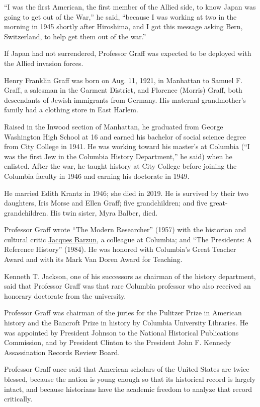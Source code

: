 ``I was the first American, the first member of the Allied side, to know
Japan was going to get out of the War,'' he said, ``because I was
working at two in the morning in 1945 shortly after Hiroshima, and I got
this message asking Bern, Switzerland, to help get them out of the
war.''

If Japan had not surrendered, Professor Graff was expected to be
deployed with the Allied invasion forces.

Henry Franklin Graff was born on Aug. 11, 1921, in Manhattan to Samuel
F. Graff, a salesman in the Garment District, and Florence (Morris)
Graff, both descendants of Jewish immigrants from Germany. His maternal
grandmother's family had a clothing store in East Harlem.

Raised in the Inwood section of Manhattan, he graduated from George
Washington High School at 16 and earned his bachelor of social science
degree from City College in 1941. He was working toward his master's at
Columbia (``I was the first Jew in the Columbia History Department,'' he
said) when he enlisted. After the war, he taught history at City College
before joining the Columbia faculty in 1946 and earning his doctorate in
1949.

He married Edith Krantz in 1946; she died in 2019. He is survived by
their two daughters, Iris Morse and Ellen Graff; five grandchildren; and
five great-grandchildren. His twin sister, Myra Balber, died.

Professor Graff wrote ``The Modern Researcher'' (1957) with the
historian and cultural critic
\href{https://www.nytimes.com/2012/10/26/arts/jacques-barzun-historian-and-scholar-dies-at-104.html}{Jacques
Barzun}, a colleague at Columbia; and ``The Presidents: A Reference
History'' (1984). He was honored with Columbia's Great Teacher Award and
with its Mark Van Doren Award for Teaching.

Kenneth T. Jackson, one of his successors as chairman of the history
department, said that Professor Graff was that rare Columbia professor
who also received an honorary doctorate from the university.

Professor Graff was chairman of the juries for the Pulitzer Prize in
American history and the Bancroft Prize in history by Columbia
University Libraries. He was appointed by President Johnson to the
National Historical Publications Commission, and by President Clinton to
the President John F. Kennedy Assassination Records Review Board.

Professor Graff once said that American scholars of the United States
are twice blessed, because the nation is young enough so that its
historical record is largely intact, and because historians have the
academic freedom to analyze that record critically.

